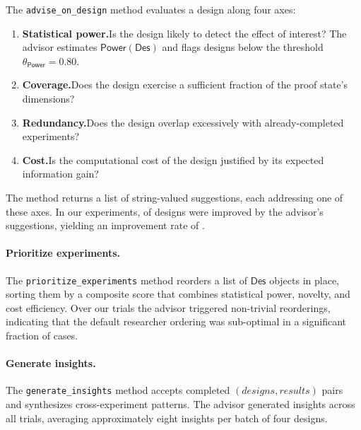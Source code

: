 \documentclass[11pt]{article}
\newcommand{\Power}{\mathsf{Power}}
\newcommand{\Design}{\mathsf{Des}}
\begin{document}
The \texttt{advise\_on\_design} method evaluates a design along
four axes:

\begin{enumerate}
  \item \textbf{Statistical power.}\quad Is the design likely to
        detect the effect of interest?  The advisor estimates
        $\Power(\Design)$ and flags designs below the threshold
        $\theta_{\Power} = 0.80$.
  \item \textbf{Coverage.}\quad Does the design exercise a
        sufficient fraction of the proof state's dimensions?
  \item \textbf{Redundancy.}\quad Does the design overlap
        excessively with already-completed experiments?
  \item \textbf{Cost.}\quad Is the computational cost of the
        design justified by its expected information gain?
\end{enumerate}

The method returns a list of string-valued suggestions, each
addressing one of these axes.  In our experiments,
\ppXCIdesignImprovements{} of \ppXCIdesignsEvaluated{} designs
were improved by the advisor's suggestions, yielding an
improvement rate of \ppXCIdesignImprovementRate{}.

\paragraph{Prioritize experiments.}
The \texttt{prioritize\_experiments} method reorders a list of
$\Design$ objects in place, sorting them by a composite score
that combines statistical power, novelty, and cost efficiency.
Over our trials the advisor triggered \ppXCIpriorityReorderings{}
non-trivial reorderings, indicating that the default researcher
ordering was sub-optimal in a significant fraction of cases.

\paragraph{Generate insights.}
The \texttt{generate\_insights} method accepts completed
$(designs, results)$ pairs and synthesizes cross-experiment
patterns.  The advisor generated \ppXCIinsightsGenerated{}
insights across all trials, averaging approximately eight
insights per batch of four designs.

\end{document}
